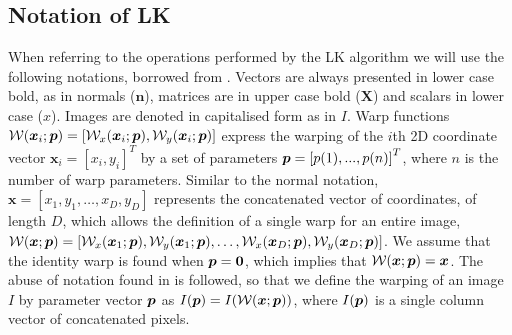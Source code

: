 \subsection{Notation of LK}\label{subsec:notation-lk}
When referring to the operations performed by the LK algorithm we will use the following notations, borrowed from \cite{RefWorks:67}. Vectors are always presented in lower case bold, as in normals ($\boldsymbol{n}$), matrices are in upper case bold ($\boldsymbol{X}$) and scalars in lower case ($x$). Images are denoted in capitalised form as in $I$. Warp functions $\mathcal{W}(\boldsymbol{x}_i;\boldsymbol{p}) = \left[ \mathcal{W}_x(\boldsymbol{x}_i;\boldsymbol{p}), \mathcal{W}_y(\boldsymbol{x}_i;\boldsymbol{p}) \right]$ express the warping of the $i$th 2D coordinate vector $\boldsymbol{x}_i = [x_i, y_i]^T$ by a set of parameters $\boldsymbol{p} = \left[p(1), ..., p(n)\right]^T$, where $n$ is the number of warp parameters. Similar to the normal notation, $\boldsymbol{x} = \left[ x_1, y_1, \ldots, x_D, y_D \right]$ represents the concatenated vector of coordinates, of length $D$, which allows the definition of a single warp for an entire image, $\mathcal{W}(\boldsymbol{x};\boldsymbol{p}) = \left[ \mathcal{W}_x(\boldsymbol{x}_1;\boldsymbol{p}), \mathcal{W}_y(\boldsymbol{x}_1;\boldsymbol{p}), \ldots, \mathcal{W}_x(\boldsymbol{x}_D;\boldsymbol{p}), \mathcal{W}_y(\boldsymbol{x}_D;\boldsymbol{p})\right]$. We assume that the identity warp is found when $\boldsymbol{p} = \boldsymbol{0}$, which implies that $\mathcal{W}(\boldsymbol{x};\boldsymbol{p}) = \boldsymbol{x}$. The abuse of notation found in \cite{RefWorks:67} is followed, so that we define the warping of an image $I$ by parameter vector $\boldsymbol{p}$ as $I(\boldsymbol{p}) = I(\mathcal{W}(\boldsymbol{x};\boldsymbol{p}))$, where $I(\boldsymbol{p})$ is a single column vector of concatenated pixels.